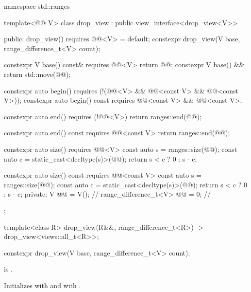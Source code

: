 %
%
%
%
\begin{codeblock}
namespace std::ranges {
  template<@@ V>
  class drop_view : public view_interface<drop_view<V>> {
  public:
    drop_view() requires @@<V> = default;
    constexpr drop_view(V base, range_difference_t<V> count);

    constexpr V base() const& requires @@<V> { return @@; }
    constexpr V base() && { return std::move(@@); }

    constexpr auto begin()
      requires (!(@@<V> &&
                  @@<const V> && @@<const V>));
    constexpr auto begin() const
      requires @@<const V> && @@<const V>;

    constexpr auto end()
      requires (!@@<V>)
    { return ranges::end(@@); }

    constexpr auto end() const
      requires @@<const V>
    { return ranges::end(@@); }

    constexpr auto size()
      requires @@<V>
    {
      const auto s = ranges::size(@@);
      const auto c = static_cast<decltype(s)>(@@);
      return s < c ? 0 : s - c;
    }

    constexpr auto size() const
      requires @@<const V>
    {
      const auto s = ranges::size(@@);
      const auto c = static_cast<decltype(s)>(@@);
      return s < c ? 0 : s - c;
    }
  private:
    V @@ = V();                              // \expos
    range_difference_t<V> @@ = 0;           // \expos
  };

  template<class R>
    drop_view(R&&, range_difference_t<R>) -> drop_view<views::all_t<R>>;
}
\end{codeblock}

%
\begin{itemdecl}
constexpr drop_view(V base, range_difference_t<V> count);
\end{itemdecl}

\begin{itemdescr}
\pnum
\expects
{} is .

\pnum
\effects
Initializes  with  and
 with .
\end{itemdescr}

